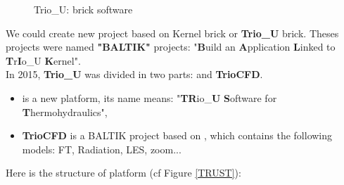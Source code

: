 \begin{figure}[h!]
\begin{center}
\caption{Trio\_U: brick software}
\label{TrioU}
\end{center}
\end{figure}

We could create new project based on Kernel brick or \textbf{Trio\_U} brick. 
Theses projects were named \textbf{"BALTIK"} projects: "\textbf{B}uild an \textbf{A}pplication \textbf{L}inked to \textbf{T}r\textbf{I}o\_U \textbf{K}ernel".\\

In 2015, \textbf{Trio\_U} was divided in two parts: \trust and \textbf{TrioCFD}.
\begin{itemize}
\item \trust is a new platform, its name means: "\textbf{TR}io\_\textbf{U} \textbf{S}oftware for \textbf{T}hermohydraulics",
\item \textbf{TrioCFD} is a BALTIK project based on \trust, which contains the following models: FT, Radiation, LES, zoom...
\end{itemize}

Here is the structure of \trust platform (cf Figure \ref{TRUST}):

